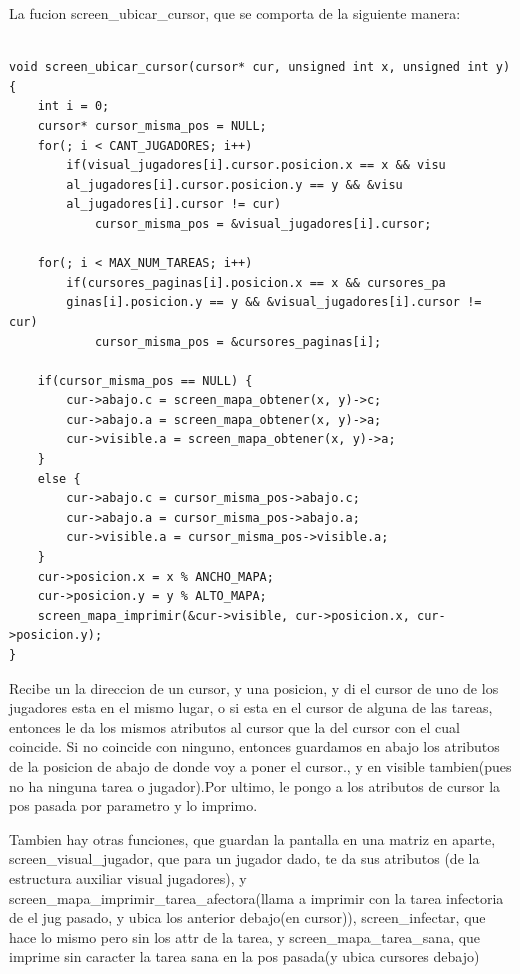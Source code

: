 \documentclass[a4paper]{article}
\newenvironment{codesnippet}{%
	\begin{Sbox}\begin{minipage}{\textwidth}\sffamily\small}%
	{\end{minipage}\end{Sbox}%
		\begin{center}%
		\vspace{-0.4cm}\colorbox{litegrey}{\TheSbox}\end{center}\vspace{0.3cm}}
\begin{document}
La fucion screen_ubicar_cursor, que se comporta de la siguiente manera:

\begin{codesnippet}
\begin{verbatim}		

void screen_ubicar_cursor(cursor* cur, unsigned int x, unsigned int y) {
    int i = 0;
    cursor* cursor_misma_pos = NULL;
    for(; i < CANT_JUGADORES; i++) 
        if(visual_jugadores[i].cursor.posicion.x == x && visu
        al_jugadores[i].cursor.posicion.y == y && &visu
        al_jugadores[i].cursor != cur) 
            cursor_misma_pos = &visual_jugadores[i].cursor;

    for(; i < MAX_NUM_TAREAS; i++) 
        if(cursores_paginas[i].posicion.x == x && cursores_pa
        ginas[i].posicion.y == y && &visual_jugadores[i].cursor != cur) 
            cursor_misma_pos = &cursores_paginas[i];

    if(cursor_misma_pos == NULL) {
        cur->abajo.c = screen_mapa_obtener(x, y)->c;
        cur->abajo.a = screen_mapa_obtener(x, y)->a;
        cur->visible.a = screen_mapa_obtener(x, y)->a;
    }
    else {
        cur->abajo.c = cursor_misma_pos->abajo.c;
        cur->abajo.a = cursor_misma_pos->abajo.a;
        cur->visible.a = cursor_misma_pos->visible.a;
    }
    cur->posicion.x = x % ANCHO_MAPA;
    cur->posicion.y = y % ALTO_MAPA;
    screen_mapa_imprimir(&cur->visible, cur->posicion.x, cur->posicion.y);
}
\end{verbatim}
\end{codesnippet}


Recibe un la direccion de un cursor, y una posicion, y di el cursor de uno de los jugadores esta en el mismo lugar, o si esta en el cursor de alguna de las tareas, entonces le da los mismos atributos al cursor que la del cursor con el cual coincide. Si no coincide con ninguno, entonces guardamos en abajo los atributos de la posicion de abajo de donde voy a poner el cursor., y en visible tambien(pues no ha ninguna tarea o jugador).Por ultimo, le pongo a los atributos de cursor la pos pasada por parametro y lo imprimo.

Tambien hay otras funciones, que guardan la pantalla en una matriz en aparte,
screen_visual_jugador, que para un jugador dado, te da sus atributos (de la estructura auxiliar visual jugadores),  y screen_mapa_imprimir_tarea_afectora(llama a imprimir con la tarea infectoria de el jug pasado, y ubica los anterior debajo(en cursor)), screen_infectar, que hace lo mismo  pero sin los attr de la tarea, y screen_mapa_tarea_sana, que imprime sin caracter la tarea sana en la pos pasada(y ubica cursores debajo)
\end{document}
